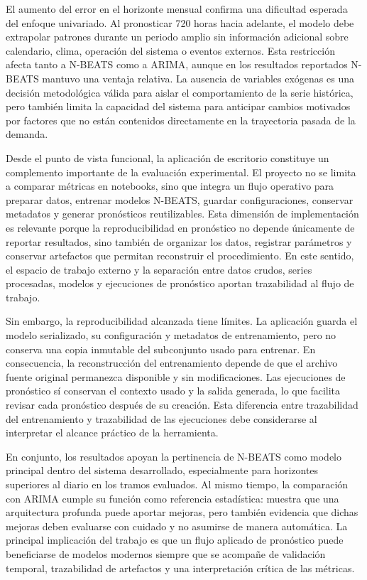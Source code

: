 El aumento del error en el horizonte mensual confirma una dificultad esperada del enfoque univariado. Al pronosticar 720 horas hacia adelante, el modelo debe extrapolar patrones durante un periodo amplio sin información adicional sobre calendario, clima, operación del sistema o eventos externos. Esta restricción afecta tanto a N-BEATS como a ARIMA, aunque en los resultados reportados N-BEATS mantuvo una ventaja relativa. La ausencia de variables exógenas es una decisión metodológica válida para aislar el comportamiento de la serie histórica, pero también limita la capacidad del sistema para anticipar cambios motivados por factores que no están contenidos directamente en la trayectoria pasada de la demanda.

Desde el punto de vista funcional, la aplicación de escritorio constituye un complemento importante de la evaluación experimental. El proyecto no se limita a comparar métricas en notebooks, sino que integra un flujo operativo para preparar datos, entrenar modelos N-BEATS, guardar configuraciones, conservar metadatos y generar pronósticos reutilizables. Esta dimensión de implementación es relevante porque la reproducibilidad en pronóstico no depende únicamente de reportar resultados, sino también de organizar los datos, registrar parámetros y conservar artefactos que permitan reconstruir el procedimiento. En este sentido, el espacio de trabajo externo y la separación entre datos crudos, series procesadas, modelos y ejecuciones de pronóstico aportan trazabilidad al flujo de trabajo.

Sin embargo, la reproducibilidad alcanzada tiene límites. La aplicación guarda el modelo serializado, su configuración y metadatos de entrenamiento, pero no conserva una copia inmutable del subconjunto usado para entrenar. En consecuencia, la reconstrucción del entrenamiento depende de que el archivo fuente original permanezca disponible y sin modificaciones. Las ejecuciones de pronóstico sí conservan el contexto usado y la salida generada, lo que facilita revisar cada pronóstico después de su creación. Esta diferencia entre trazabilidad del entrenamiento y trazabilidad de las ejecuciones debe considerarse al interpretar el alcance práctico de la herramienta.

En conjunto, los resultados apoyan la pertinencia de N-BEATS como modelo principal dentro del sistema desarrollado, especialmente para horizontes superiores al diario en los tramos evaluados. Al mismo tiempo, la comparación con ARIMA cumple su función como referencia estadística: muestra que una arquitectura profunda puede aportar mejoras, pero también evidencia que dichas mejoras deben evaluarse con cuidado y no asumirse de manera automática. La principal implicación del trabajo es que un flujo aplicado de pronóstico puede beneficiarse de modelos modernos siempre que se acompañe de validación temporal, trazabilidad de artefactos y una interpretación crítica de las métricas.
